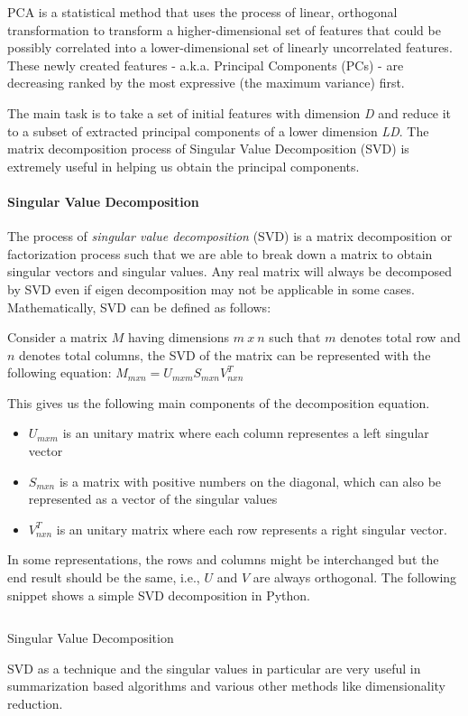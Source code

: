 PCA is a statistical method that uses the process of linear, orthogonal
transformation to transform a higher-dimensional set of features that
could be possibly correlated into a lower-dimensional set of linearly
uncorrelated features. These newly created features - a.k.a. Principal
Components (PCs) - are decreasing ranked by the most expressive (the
maximum variance) first.

The main task is to take a set of initial features with dimension
\emph{D} and reduce it to a subset of extracted principal components of
a lower dimension \emph{LD}. The matrix decomposition process of
Singular Value Decomposition (SVD) is extremely useful in helping us
obtain the principal components.

\hypertarget{singular-value-decomposition}{%
\paragraph{Singular Value
Decomposition}\label{singular-value-decomposition}}

The process of \emph{singular value decomposition} (SVD) is a matrix
decomposition or factorization process such that we are able to break
down a matrix to obtain singular vectors and singular values. Any real
matrix will always be decomposed by SVD even if eigen decomposition may
not be applicable in some cases. Mathematically, SVD can be defined as
follows:

Consider a matrix \(M\) having dimensions \(m\ x\ n\) such that \(m\)
denotes total row and \(n\) denotes total columns, the SVD of the matrix
can be represented with the following equation:
\(M_{mxn} = U_{mxm}S_{mxn}V^{T}_{nxn}\)

This gives us the following main components of the decomposition
equation.

\begin{itemize}
\item
  \(U_{mxm}\) is an unitary matrix where each column representes a left
  singular vector
\item
  \(S_{mxn}\) is a matrix with positive numbers on the diagonal, which
  can also be represented as a vector of the singular values
\item
  \(V^{T}_{nxn}\) is an unitary matrix where each row represents a right
  singular vector.
\end{itemize}

In some representations, the rows and columns might be interchanged but
the end result should be the same, i.e., \(U\) and \(V\) are always
orthogonal. The following snippet shows a simple SVD decomposition in
Python.

\begin{listing}[H]
  \inputminted{python}{svd.py}
  \caption{Singular Value Decomposition}
  \label{lst:SVD}
\end{listing}

SVD as a technique and the singular values in particular are very useful
in summarization based algorithms and various other methods like
dimensionality reduction.
